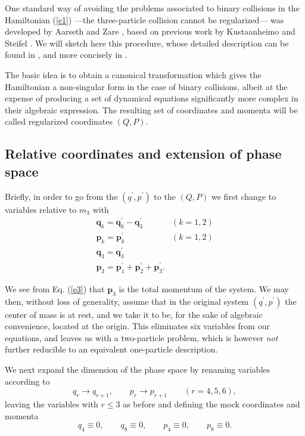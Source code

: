 \documentclass[thmsa]{article}
\begin{document}
One standard way of avoiding the problems associated to binary collisions in
the Hamiltonian (\ref{e1}) ---the three-particle collision cannot be
regularized--- was developed by Aarseth and Zare \cite{Aarseth}, based on
previous work by Kustaanheimo and Steifel \cite{Kust}. We will sketch here
this procedure, whose detailed description can be found in \cite{Aarseth},
and more concisely in \cite{Richter(clasicos)}.

The basic idea is to obtain a canonical transformation which gives the
Hamiltonian a non-singular form in the case of binary collisions, albeit at
the expense of producing a set of dynamical equations significantly more
complex in their algebraic expression. The resulting set of coordinates and
momenta will be called regularized coordinates $(Q,P)$.

\subsection{Relative coordinates and extension of phase space}

Briefly, in order to go from the $(q^{\prime },p^{\prime })$ to the $(Q,P)$
we first change to variables relative to $m_3$ with 
\begin{equation}
\begin{array}{lc}
\mathbf{q}_k=\mathbf{q}_k^{\prime }-\mathbf{q}_3^{\prime }\quad \quad & 
(k=1,2) \\ 
\mathbf{p}_k=\mathbf{p}_k^{\prime }\quad \quad & (k=1,2) \\ 
\mathbf{q}_3=\mathbf{q}_3^{\prime } &  \\ 
\mathbf{p}_3=\mathbf{p}_1^{\prime }+\mathbf{p}_2^{\prime }+\mathbf{p}%
_3^{\prime }. & 
\end{array}
\label{e3}
\end{equation}

We see from Eq. (\ref{e3}) that $\mathbf{p}_3$ is the total momentum of the
system. We may then, without loss of generality, assume that in the original
system $(q^{\prime },p^{\prime })$ the center of mass is at rest, and we
take it to be, for the sake of algebraic convenience, located at the origin.
This eliminates six variables from our equations, and leaves us with a
two-particle problem, which is however \emph{not} further reducible to an
equivalent one-particle description.

We next expand the dimension of the phase space by renaming variables
according to 
\begin{equation}
q_r\rightarrow q_{r+1},\quad \quad p_r\rightarrow p_{r+1}\quad \quad
(r=4,5,6),  \label{e4}
\end{equation}
leaving the variables with $r\leq 3$ as before and defining the mock
coordinates and momenta 
\begin{equation}
q_4\equiv 0,\quad \quad q_8\equiv 0,\quad \quad p_4\equiv 0,\quad \quad
p_8\equiv 0.  \label{e5}
\end{equation}
\end{document}
